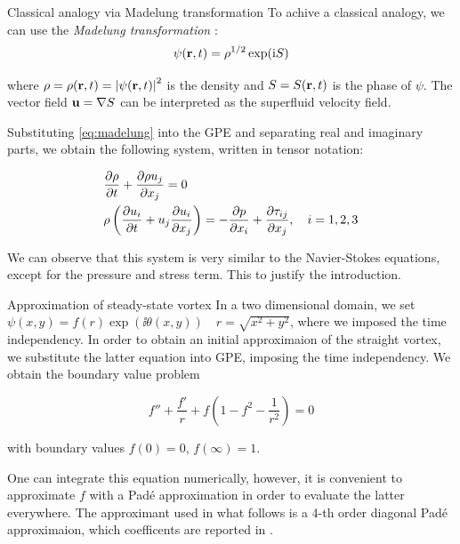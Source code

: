 \begin{frame}[allowframebreaks]{Classical analogy via Madelung transformation}
    To achive a classical analogy, we can use the \emph{Madelung transformation} \cite{madelung1927quantentheorie}:
    \begin{equation}
        \psi(\mathbf{r}, t) = \rho^{1/2}\exp(\mathrm{i} S)
        \label{eq:madelung}
    \end{equation}    

    where $\rho = \rho(\mathbf{r}, t) = \left| \psi(\mathbf{r}, t) \right|^2$ is the density and $S = S(\mathbf{r}, t)$ is the phase of $\psi$. The vector field $\mathbf{u} = \nabla S$ can be interpreted as the superfluid velocity field.

    Substituting \eqref{eq:madelung} into the GPE and separating real and imaginary parts, we obtain the following system, written in tensor notation:

    \begin{align*}
        &\frac{\partial \rho}{\partial t} + \frac{\partial \rho u_j}{\partial x_j} = 0 \\
        &\rho \left(\frac{\partial u_i}{\partial t} + u_j \frac{\partial u_i}{\partial x_j}\right) = -\frac{\partial p}{\partial x_i} + \frac{\partial \tau_{ij}}{\partial x_j}, \quad i = 1,2,3
    \end{align*}

    We can observe that this system is very similar to the Navier-Stokes equations, except for the pressure and stress term. This to justify the introduction.
\end{frame}

\begin{frame}[allowframebreaks]{Approximation of steady-state vortex}
    In a two dimensional domain, we set $\psi(x,y) = f(r)\exp(\ii \theta(x,y)) \quad r = \sqrt{x^2 + y^2}$, where we imposed the time independency.
    In order to obtain an initial approximaion of the straight vortex, we substitute the latter equation into GPE, imposing the time independency. We obtain the boundary value problem

    \begin{equation*}
        f'' + \frac{f'}{r} + f\left(1 - f^2 - \frac{1}{r^2}\right) = 0
    \end{equation*}

    with boundary values $f(0) = 0$, $f(\infty) = 1$.

    One can integrate this equation numerically, however, it is convenient to approximate $f$ with a Padé approximation \cite{Berloff20041617} in order to evaluate the latter everywhere. The approximant used in what follows is a 4-th order diagonal Padé approximaion, which coefficents are reported in \cite{CZ18}.
\end{frame}